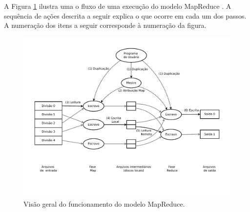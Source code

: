 A Figura \ref{fig:mapreduceoverview} ilustra uma o fluxo de uma execução do modelo MapReduce \cite{Dean:2008}. A sequência de ações descrita a seguir explica o que ocorre em cada um dos passos. A numeração dos itens a seguir corresponde à numeração da figura.



 \begin{figure}[!htb]
 \centering
\includegraphics[trim=1cm 0cm 2cm 0cm, width=.7\textwidth, angle=270]{figuras/MapReduceOverflow.pdf}
\caption{Visão geral do funcionamento do modelo MapReduce.}
\label{fig:mapreduceoverview}
\end{figure}



